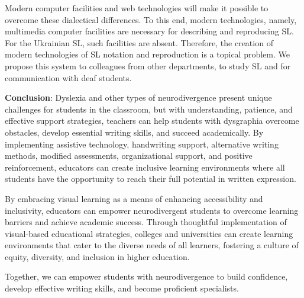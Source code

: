 \documentclass[a4paper,12pt]{article}
\begin{document}
\begin{large}
Modern computer facilities and web technologies will make it possible to overcome these dialectical differences. To this end, modern technologies, namely, multimedia computer facilities are necessary for describing and reproducing SL. For the Ukrainian SL, such facilities are absent. Therefore, the creation of modern technologies of SL notation and reproduction is a topical problem.
We propose this system to colleagues from other departments, to study SL and for communication with deaf students.


\textbf{Conclusion}:
Dyslexia and other types of neurodivergence present unique challenges for students in the classroom, but with understanding, patience, and effective support strategies, teachers can help students with dysgraphia overcome obstacles, develop essential writing skills, and succeed academically. By implementing assistive technology, handwriting support, alternative writing methods, modified assessments, organizational support, and positive reinforcement, educators can create inclusive learning environments where all students have the opportunity to reach their full potential in written expression.

By embracing visual learning as a means of enhancing accessibility and inclusivity, educators can empower neurodivergent students to overcome learning barriers and achieve academic success. Through thoughtful implementation of visual-based educational strategies, colleges and universities can create learning environments that cater to the diverse needs of all learners, fostering a culture of equity, diversity, and inclusion in higher education.

Together, we can empower students with neurodivergence to build confidence, develop effective writing skills, and become proficient specialists.

\end{large}
\end{document}
